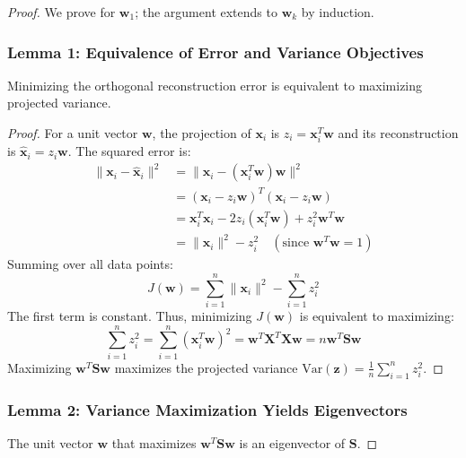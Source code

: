 \documentclass{article}
\begin{document}
\begin{proof}

We prove for $\mathbf{w}_1$; the argument extends to $\mathbf{w}_k$ by induction.

\subsubsection*{Lemma 1: Equivalence of Error and Variance Objectives}
Minimizing the orthogonal reconstruction error is equivalent to maximizing projected variance.

\begin{proof}
For a unit vector $\mathbf{w}$, the projection of $\mathbf{x}_i$ is $z_i = \mathbf{x}_i^T\mathbf{w}$ and its reconstruction is $\hat{\mathbf{x}}_i = z_i\mathbf{w}$. The squared error is:
\begin{align*}
    \|\mathbf{x}_i - \hat{\mathbf{x}}_i\|^2 &= \|\mathbf{x}_i - (\mathbf{x}_i^T\mathbf{w})\mathbf{w}\|^2 \\
    &= (\mathbf{x}_i - z_i\mathbf{w})^T(\mathbf{x}_i - z_i\mathbf{w}) \\
    &= \mathbf{x}_i^T\mathbf{x}_i - 2z_i(\mathbf{x}_i^T\mathbf{w}) + z_i^2\mathbf{w}^T\mathbf{w} \\
    &= \|\mathbf{x}_i\|^2 - z_i^2 \quad (\text{since } \mathbf{w}^T\mathbf{w}=1)
\end{align*}
Summing over all data points:
\begin{equation*}
    J(\mathbf{w}) = \sum_{i=1}^n \|\mathbf{x}_i\|^2 - \sum_{i=1}^n z_i^2
\end{equation*}
The first term is constant. Thus, minimizing $J(\mathbf{w})$ is equivalent to maximizing:
\begin{equation*}
    \sum_{i=1}^n z_i^2 = \sum_{i=1}^n (\mathbf{x}_i^T\mathbf{w})^2 = \mathbf{w}^T\mathbf{X}^T\mathbf{X}\mathbf{w} = n\mathbf{w}^T\mathbf{S}\mathbf{w}
\end{equation*}
Maximizing $\mathbf{w}^T\mathbf{S}\mathbf{w}$ maximizes the projected variance $\text{Var}(\mathbf{z}) = \frac{1}{n}\sum_{i=1}^n z_i^2$.
\end{proof}

\subsubsection*{Lemma 2: Variance Maximization Yields Eigenvectors}
The unit vector $\mathbf{w}$ that maximizes $\mathbf{w}^T\mathbf{S}\mathbf{w}$ is an eigenvector of $\mathbf{S}$.


\end{proof}
\end{document}

